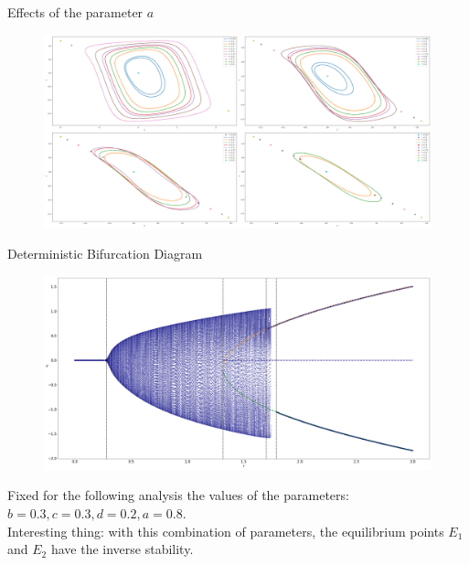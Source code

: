 \documentclass[10pt]{beamer}
\begin{document}
\begin{frame}{Effects of the parameter $a$}
	\begin{figure}
		\includegraphics[width=\textwidth, height=\textheight,keepaspectratio]{figures_2/adv-attractors-a.png}
	\end{figure}
\end{frame}

\begin{frame}{Deterministic Bifurcation Diagram}
	\begin{figure}
		\includegraphics[width=\textwidth, height=\textheight,keepaspectratio]{figures_2/adv-noiseless-phase-portrait.png}
	\end{figure}
	Fixed for the following analysis the values of the parameters: $b=0.3, c=0.3, d=0.2, a=0.8$. \\
	Interesting thing: with this combination of parameters, the equilibrium points $E_1$ and $E_2$ 
	have the inverse stability.
\end{frame}
\end{document}
